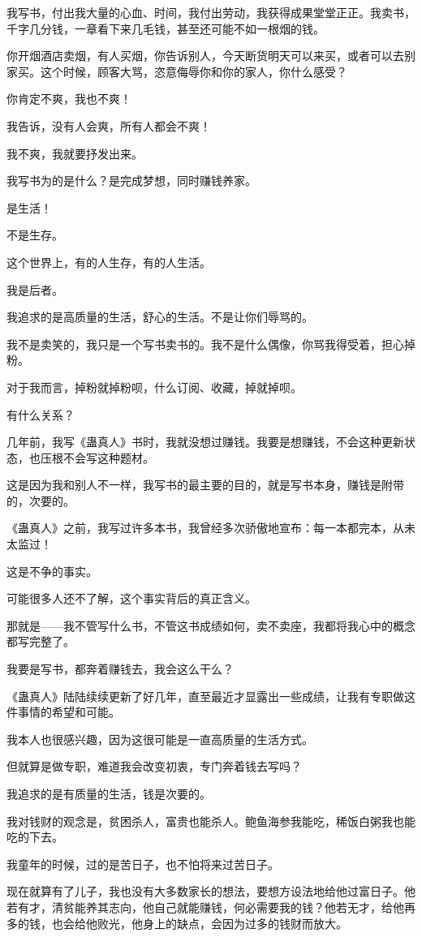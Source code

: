 \begin{this_body}
我写书，付出我大量的心血、时间，我付出劳动，我获得成果堂堂正正。我卖书，千字几分钱，一章看下来几毛钱，甚至还可能不如一根烟的钱。

你开烟酒店卖烟，有人买烟，你告诉别人，今天断货明天可以来买，或者可以去别家买。这个时候，顾客大骂，恣意侮辱你和你的家人，你什么感受？

你肯定不爽，我也不爽！

我告诉，没有人会爽，所有人都会不爽！

我不爽，我就要抒发出来。

我写书为的是什么？是完成梦想，同时赚钱养家。

是生活！

不是生存。

这个世界上，有的人生存，有的人生活。

我是后者。

我追求的是高质量的生活，舒心的生活。不是让你们辱骂的。

我不是卖笑的，我只是一个写书卖书的。我不是什么偶像，你骂我得受着，担心掉粉。

对于我而言，掉粉就掉粉呗，什么订阅、收藏，掉就掉呗。

有什么关系？

几年前，我写《蛊真人》书时，我就没想过赚钱。我要是想赚钱，不会这种更新状态，也压根不会写这种题材。

这是因为我和别人不一样，我写书的最主要的目的，就是写书本身，赚钱是附带的，次要的。

《蛊真人》之前，我写过许多本书，我曾经多次骄傲地宣布：每一本都完本，从未太监过！

这是不争的事实。

可能很多人还不了解，这个事实背后的真正含义。

那就是——我不管写什么书，不管这书成绩如何，卖不卖座，我都将我心中的概念都写完整了。

我要是写书，都奔着赚钱去，我会这么干么？

《蛊真人》陆陆续续更新了好几年，直至最近才显露出一些成绩，让我有专职做这件事情的希望和可能。

我本人也很感兴趣，因为这很可能是一直高质量的生活方式。

但就算是做专职，难道我会改变初衷，专门奔着钱去写吗？

我追求的是有质量的生活，钱是次要的。

我对钱财的观念是，贫困杀人，富贵也能杀人。鲍鱼海参我能吃，稀饭白粥我也能吃的下去。

我童年的时候，过的是苦日子，也不怕将来过苦日子。

现在就算有了儿子，我也没有大多数家长的想法，要想方设法地给他过富日子。他若有才，清贫能养其志向，他自己就能赚钱，何必需要我的钱？他若无才，给他再多的钱，也会给他败光，他身上的缺点，会因为过多的钱财而放大。


\end{this_body}
